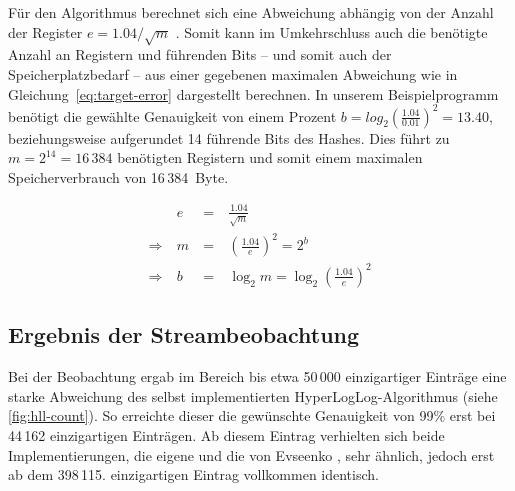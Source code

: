 
Für den Algorithmus berechnet sich eine Abweichung abhängig von der Anzahl der Register $e=1.04/\sqrt{m}$ \cite{flajolet2007}.
Somit kann im Umkehrschluss auch die benötigte Anzahl an Registern und führenden Bits -- und somit auch der Speicherplatzbedarf -- aus einer gegebenen maximalen Abweichung wie in Gleichung~\eqref{eq:target-error} dargestellt berechnen.
In unserem Beispielprogramm benötigt die gewählte Genauigkeit von einem Prozent $b = log_2 (\frac{1.04}{0.01})^2 = 13.40$, beziehungsweise aufgerundet 14 führende Bits des Hashes.
Dies führt zu $m = 2^{14} = 16\,384$ benötigten Registern und somit einem maximalen Speicherverbrauch von 16\,384~Byte.

\begin{equation}
	\begin{alignedat}{2}
		& e & \: = \: & \frac{1.04}{\sqrt{m}} \\
		\Rightarrow \: & m & \: = \: & \left(\frac{1.04}{e}\right)^2 = 2^b \\
		\Rightarrow \: & b & \: = \: & \log_2 m = \log_2 \left(\frac{1.04}{e}\right)^2
	\end{alignedat}
	\label{eq:target-error}
\end{equation}

\subsection{Ergebnis der Streambeobachtung}

Bei der Beobachtung ergab im Bereich bis etwa 50\,000 einzigartiger Einträge eine starke Abweichung des selbst implementierten HyperLogLog-Algorithmus (siehe \autoref{fig:hll-count}).
So erreichte dieser die gewünschte Genauigkeit von 99\% erst bei 44\,162 einzigartigen Einträgen.
Ab diesem Eintrag verhielten sich beide Implementierungen, die eigene und die von Evseenko \cite{evseenko2018}, sehr ähnlich, jedoch erst ab dem 398\,115. einzigartigen Eintrag vollkommen identisch.

